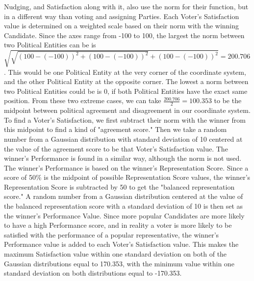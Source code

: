 \documentclass[12pt]{article}
\begin{document}
\qquad Nudging, and Satisfaction along with it, also use the norm for their function, but in a different way than voting and assigning Parties. Each Voter's Satisfaction value is determined on a weighted scale based on their norm with the winning Candidate. Since the axes range from -100 to 100, the largest the norm between two Political Entities can be is $\sqrt{\sqrt{(100 - (- 100))^2 + (100 - (- 100))^2} + (100 - (- 100))^2} = 200.706$. This would be one Political Entity at the very corner of the coordinate system, and the other Political Entity at the opposite corner. The lowest a norm between two Political Entities could be is 0, if both Political Entities have the exact same position. From these two extreme cases, we can take $\frac{200.706}{2} = 100.353$ to be the midpoint between political agreement and disagreement in our coordinate system. To find a Voter's Satisfaction, we first subtract their norm with the winner from this midpoint to find a kind of "agreement score." Then we take a random number from a Gaussian distribution with standard deviation of 10 centered at the value of the agreement score to be that Voter's Satisfaction value. The winner's Performance is found in a similar way, although the norm is not used. The winner's Performance is based on the winner's Representation Score. Since a score of 50\% is the midpoint of possible Representation Score values, the winner's Representation Score is subtracted by 50 to get the "balanced representation score." A random number from a Gaussian distribution centered at the value of the balanced representation score with a standard deviation of 10 is then set as the winner's Performance Value. Since more popular Candidates are more likely to have a high Performance score, and in reality a voter is more likely to be satisfied with the performance of a popular representative, the winner's Performance value is added to each Voter's Satisfaction value. This makes the maximum Satisfaction value within one standard deviation on both of the Gaussian distributions equal to 170.353, with the minimum value within one standard deviation on both distributions equal to -170.353. \\
\end{document}
